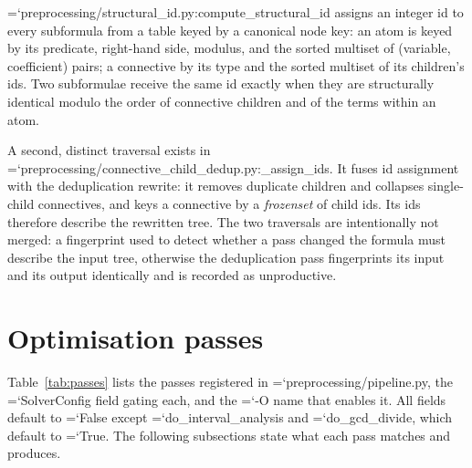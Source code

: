\documentclass[10pt,a4paper]{article}
\newcommand{\code}[1]{{\small\ttfamily\hyphenchar\font=`\-\relax #1}}
\begin{document}
\code{preprocessing/structural\_\allowbreak id.py:\allowbreak compute\_\allowbreak structural\_\allowbreak id} assigns an integer id to every
subformula from a table keyed by a canonical node key: an atom is keyed by its predicate, right-hand
side, modulus, and the sorted multiset of (variable, coefficient) pairs; a connective by its type and
the sorted multiset of its children's ids.  Two subformulae receive the same id exactly when they are
structurally identical modulo the order of connective children and of the terms within an atom.

A second, distinct traversal exists in
\code{preprocessing/connective\_\allowbreak child\_\allowbreak dedup.py:\allowbreak \_\allowbreak assign\_\allowbreak ids}.  It fuses id assignment with the
deduplication rewrite: it removes duplicate children and collapses single-child connectives, and keys a
connective by a \emph{frozenset} of child ids.  Its ids therefore describe the rewritten tree.  The two
traversals are intentionally not merged: a fingerprint used to detect whether a pass changed the
formula must describe the input tree, otherwise the deduplication pass fingerprints its input and its
output identically and is recorded as unproductive.

\section{Optimisation passes}
\label{sec:passes}

Table~\ref{tab:passes} lists the passes registered in \code{preprocessing/pipeline.py}, the
\code{SolverConfig} field gating each, and the \code{-O} name that enables it.  All fields default to
\code{False} except \code{do\_interval\_analysis} and \code{do\_gcd\_divide}, which default to
\code{True}.  The following subsections state what each pass matches and produces.
\end{document}
